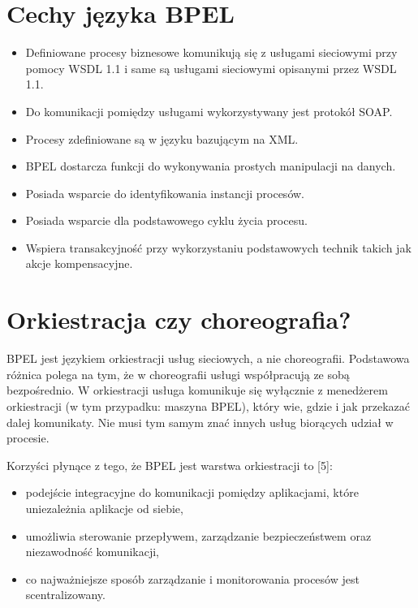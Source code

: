 \section{Cechy języka BPEL}
\label{sec:bpelFeatures}

\begin{itemize}
\item Definiowane procesy biznesowe komunikują się z usługami sieciowymi przy pomocy WSDL 1.1 i same są usługami sieciowymi opisanymi przez WSDL 1.1.  
\item Do komunikacji pomiędzy usługami wykorzystywany jest protokół SOAP.
\item Procesy zdefiniowane są w języku bazującym na XML.
\item BPEL dostarcza funkcji do wykonywania prostych manipulacji na danych.
\item Posiada wsparcie do identyfikowania instancji procesów.
\item Posiada wsparcie dla podstawowego cyklu życia procesu.
\item Wspiera transakcyjność przy wykorzystaniu podstawowych technik takich jak akcje kompensacyjne.
\end{itemize}


\section{Orkiestracja czy choreografia?}
\label{sec:bpelOrchestration}
BPEL jest językiem orkiestracji usług sieciowych, a nie choreografii. Podstawowa różnica polega na tym, że w choreografii usługi współpracują ze sobą bezpośrednio. W orkiestracji usługa komunikuje się wyłącznie z menedżerem orkiestracji (w tym przypadku: maszyna BPEL), który wie, gdzie i jak przekazać dalej komunikaty. Nie musi tym samym znać innych usług biorących udział w procesie. 

Korzyści płynące z tego, że BPEL jest warstwa orkiestracji to [5]:

\begin{itemize}
\item podejście integracyjne do komunikacji pomiędzy aplikacjami, które uniezależnia aplikacje od siebie,  
\item umożliwia sterowanie przepływem, zarządzanie bezpieczeństwem oraz niezawodność komunikacji,
\item co najważniejsze sposób zarządzanie i monitorowania procesów jest scentralizowany. 
\end{itemize}

